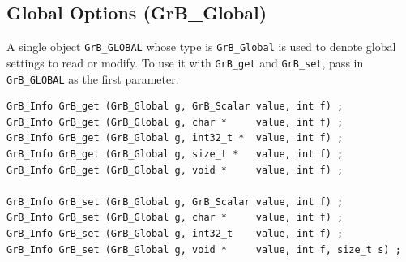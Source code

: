 
\subsection{Global Options ({\sf GrB\_Global})}
\label{get_set_global}

A single object \verb'GrB_GLOBAL' whose type is \verb'GrB_Global' is used to
denote global settings to read or modify.  To use it with \verb'GrB_get' and
\verb'GrB_set', pass in \verb'GrB_GLOBAL' as the first parameter.

\begin{mdframed}[userdefinedwidth=6in]
{\footnotesize
\begin{verbatim}
GrB_Info GrB_get (GrB_Global g, GrB_Scalar value, int f) ;
GrB_Info GrB_get (GrB_Global g, char *     value, int f) ;
GrB_Info GrB_get (GrB_Global g, int32_t *  value, int f) ;
GrB_Info GrB_get (GrB_Global g, size_t *   value, int f) ;
GrB_Info GrB_get (GrB_Global g, void *     value, int f) ;

GrB_Info GrB_set (GrB_Global g, GrB_Scalar value, int f) ;
GrB_Info GrB_set (GrB_Global g, char *     value, int f) ;
GrB_Info GrB_set (GrB_Global g, int32_t    value, int f) ;
GrB_Info GrB_set (GrB_Global g, void *     value, int f, size_t s) ;
\end{verbatim}
}\end{mdframed}


